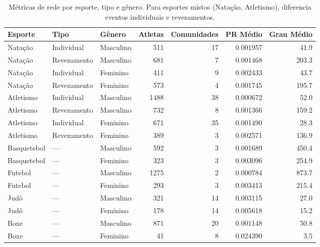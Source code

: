 \begin{table}[htbp]
\caption{Métricas de rede por esporte, tipo e gênero. Para esportes mistos (Natação, Atletismo), diferencia eventos individuais e revezamentos.}
\label{tab:network_metrics}
\centering
\footnotesize
\begin{tabular}{lllrrrr}
\toprule
\textbf{Esporte} & \textbf{Tipo} & \textbf{Gênero} & \textbf{Atletas} & \textbf{Comunidades} & \textbf{PR Médio} & \textbf{Grau Médio} \\
\midrule
Natação & Individual & Masculino & 511 & 17 & 0.001957 & 41.9 \\
Natação & Revezamento & Masculino & 681 & 7 & 0.001468 & 203.3 \\
Natação & Individual & Feminino & 411 & 9 & 0.002433 & 43.7 \\
Natação & Revezamento & Feminino & 573 & 4 & 0.001745 & 195.7 \\
Atletismo & Individual & Masculino & 1488 & 38 & 0.000672 & 52.0 \\
Atletismo & Revezamento & Masculino & 732 & 8 & 0.001366 & 159.2 \\
Atletismo & Individual & Feminino & 671 & 35 & 0.001490 & 28.3 \\
Atletismo & Revezamento & Feminino & 389 & 3 & 0.002571 & 136.9 \\
Basquetebol & — & Masculino & 592 & 3 & 0.001689 & 450.4 \\
Basquetebol & — & Feminino & 323 & 3 & 0.003096 & 254.9 \\
Futebol & — & Masculino & 1275 & 2 & 0.000784 & 873.7 \\
Futebol & — & Feminino & 293 & 3 & 0.003413 & 215.4 \\
Judô & — & Masculino & 321 & 14 & 0.003115 & 27.0 \\
Judô & — & Feminino & 178 & 14 & 0.005618 & 15.2 \\
Boxe & — & Masculino & 871 & 20 & 0.001148 & 50.8 \\
Boxe & — & Feminino & 41 & 8 & 0.024390 & 3.5 \\
\bottomrule
\end{tabular}
\end{table}
